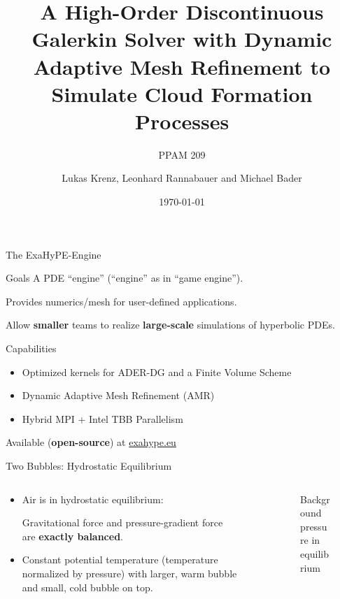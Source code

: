 \documentclass[aspectratio=169]{beamer}
\title[High-Order DG with Dynamic AMR to Simulate Clouds]{A High-Order Discontinuous Galerkin Solver with Dynamic Adaptive Mesh Refinement to Simulate Cloud Formation Processes}
\subtitle{PPAM 209}
\author[L.\ Krenz, L.\ Rannabauer, M.\ Bader]{Lukas Krenz, Leonhard Rannabauer and Michael Bader}
\date{\today}
\institute{Technical University of Munich}
\begin{document}
\maketitle
\begin{frame}{The ExaHyPE-Engine}
  \begin{block}{Goals}
   A PDE \enquote{engine} (\enquote{engine} as in \enquote{game engine}).

   Provides numerics/mesh for user-defined applications.

   Allow \textbf{smaller} teams to realize \textbf{large-scale} simulations of hyperbolic PDEs.
  \end{block}
  \begin{block}{Capabilities}
    \begin{itemize}
    \item Optimized kernels for ADER-DG and a Finite Volume Scheme
    \item Dynamic Adaptive Mesh Refinement (AMR)
    \item Hybrid MPI + Intel TBB Parallelism
    \end{itemize}
  \end{block}

  Available (\textbf{open-source}) at \url{exahype.eu}
\end{frame}

\begin{frame}{Two Bubbles: Hydrostatic Equilibrium}
  \begin{columns}
    \begin{column}[t]{0.5\textwidth}
      \begin{itemize}
      \item 
  Air is in hydrostatic equilibrium:

  Gravitational force and pressure-gradient force are \textbf{exactly balanced}.

  \item Constant potential temperature (temperature normalized by pressure) with larger, warm bubble and small, cold bubble on top.
      
  \end{itemize}
    \end{column}~%
    \begin{column}[t]{0.5\textwidth}
      \begin{figure}[h]
         {
        }
\caption{Background pressure in equilibrium}
\end{figure}
    \end{column}
  \end{columns}
\end{frame}
\end{document}
